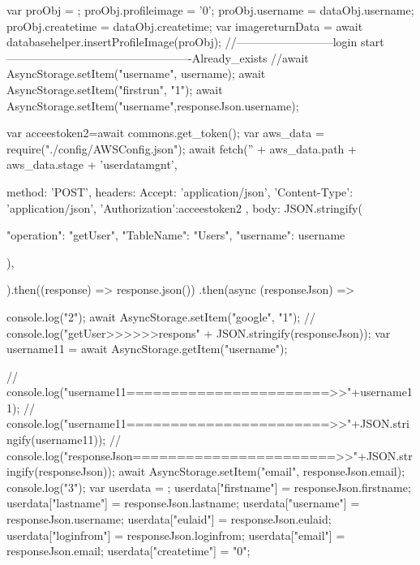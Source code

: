 {{{{{{{{{{{{                  var proObj = {};
                  proObj.profileimage = '0';
                  proObj.username = dataObj.username;
                  proObj.createtime = dataObj.createtime;
                  var imagereturnData = await databasehelper.insertProfileImage(proObj);
                  //--------------------------login start-------------------------------------------------Already_exists
                  //await AsyncStorage.setItem("username", username);
                  await AsyncStorage.setItem("firstrun", "1");
                  await AsyncStorage.setItem("username",responseJson.username);
                  
                  var acceestoken2=await commons.get_token();
                  var aws_data = require("./config/AWSConfig.json");
                  await fetch('' + aws_data.path + aws_data.stage + 'userdatamgnt', {
                    method: 'POST',
                    headers: {
                      Accept: 'application/json',
                      'Content-Type': 'application/json',
                      'Authorization':acceestoken2
                    },
                    body: JSON.stringify({

                      "operation": "getUser",
                      "TableName": "Users",
                      "username": username

                    }),
                  }).then((response) => response.json())
                    .then(async (responseJson) => {
                      console.log("2");
                      await AsyncStorage.setItem("google", "1");
                     // console.log("getUser>>>>>>respons" + JSON.stringify(responseJson));
                      var username11 = await AsyncStorage.getItem("username");

                      // console.log("username11=======================>>"+username11);
                      // console.log("username11=======================>>"+JSON.stringify(username11));                 
                      // console.log("responseJson=======================>>"+JSON.stringify(responseJson));   
                      await AsyncStorage.setItem("email", responseJson.email);
                      console.log("3");
                      var userdata = {};
                      userdata["firstname"] = responseJson.firstname;
                      userdata["lastname"] = responseJson.lastname;
                      userdata["username"] = responseJson.username;
                      userdata["eulaid"] = responseJson.eulaid;
                      userdata["loginfrom"] = responseJson.loginfrom;
                      userdata["email"] = responseJson.email;
                      userdata["createtime"] = "0";


}}}}}}}}}}}}}
